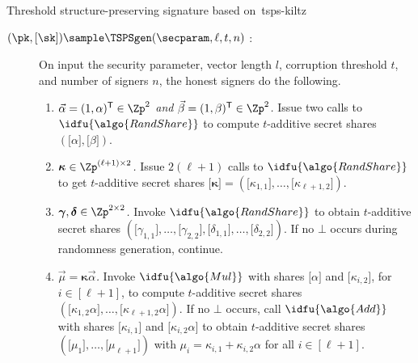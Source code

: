 \begin{protocolbox}{Threshold structure-preserving signature based
  on~\cite{C:KilPanWee15}}{tsps-kiltz}

  \begin{description}

    \item[$(\pk, \lbrack \sk\rbrack ) \sample \TSPSgen(\secparam, \ell, t, n)$
      :] On input the security parameter, vector length $l$, corruption
      threshold $t$, and number of signers $n$, the honest signers do the
      following.

      \begin{enumerate}

        \item \emph{$\vec{\alpha} = (1, \alpha)^{\mathsf{T}} \in \Zp^2$ and
          $\vec{\beta} = (1, \beta)^{\mathsf{T}} \in \Zp^2$.} Issue two calls
          to $\idfu{\algo{RandShare}}$ to compute $t$-additive secret shares
          $(\lbrack \alpha \rbrack , \lbrack \beta\rbrack )$.

        \item \emph{$\boldsymbol{\kappa} \in \Zp^{(\ell+1)\times 2}$.} Issue
          $2(\ell+1)$ calls to $\idfu{\algo{RandShare}}$ to get $t$-additive
          secret shares $\lbrack \boldsymbol{\kappa}\rbrack  = (\lbrack
          \kappa_{1,1}\rbrack , \ldots, \lbrack \kappa_{\ell+1,2}\rbrack )$.

        \item \emph{$\boldsymbol{\gamma}, \boldsymbol{\delta} \in \Zp^{2\times
          2}$.} Invoke $\idfu{\algo{RandShare}}$ to obtain $t$-additive secret
          shares $(\lbrack \gamma_{1,1}\rbrack ,\ldots, \lbrack \gamma_{2,2}
          \rbrack , \lbrack \delta_{1,1}\rbrack ,\ldots, \lbrack
          \delta_{2,2}\rbrack )$. If no $\bot$ occurs during randomness
          generation, continue.

        \item \emph{$\vec{\mu} = \boldsymbol{\kappa}\vec{\alpha}$.} Invoke
          $\idfu{\algo{Mul}}$ with shares $\lbrack \alpha\rbrack $ and $\lbrack
          \kappa_{i, 2}\rbrack $, for $i \in [\ell+1]$, to compute $t$-additive
          secret shares $(\lbrack \kappa_{1, 2}\alpha\rbrack ,\ldots, \lbrack
          \kappa_{\ell+1,2}\alpha\rbrack )$. If no $\bot$ occurs, call
          $\idfu{\algo{Add}}$ with shares $\lbrack \kappa_{i, 1}\rbrack $ and
          $\lbrack \kappa_{i, 2}\alpha\rbrack $ to obtain $t$-additive secret
          shares $(\lbrack \mu_1\rbrack ,\ldots, \lbrack \mu_{\ell+1}\rbrack )$
          with $\mu_i = \kappa_{i, 1}+ \kappa_{i, 2}\alpha$ for all $i \in
          [\ell+1]$.


\end{enumerate}
\end{description}
\end{protocolbox}
